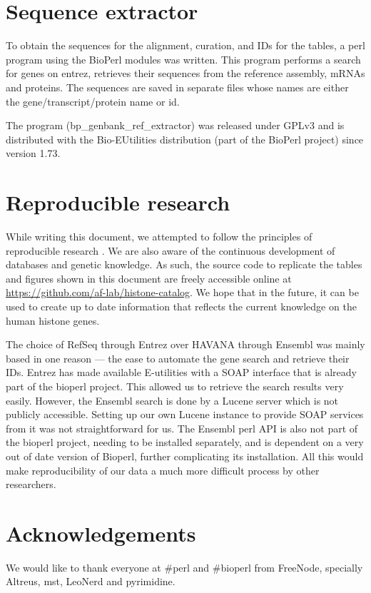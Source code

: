 \documentclass[10pt,a4paper,twocolumn,article]{memoir}
\begin{document}
  \section{Sequence extractor}
    To obtain the sequences for the alignment, curation, and IDs for the tables, a perl program using the
    BioPerl modules was written. This program performs a search for genes on entrez, retrieves
    their sequences from the reference assembly, mRNAs and proteins. The sequences are saved in separate files whose
    names are either the gene/transcript/protein name or id.

    The program (bp\_genbank\_ref\_extractor) was released under GPLv3 and is distributed with
    the Bio-EUtilities distribution (part of the BioPerl project) since version 1.73.


  \section{Reproducible research}
  \label{sec:reproducible}
    While writing this document, we attempted to follow the principles of reproducible research
    \citep{reproducible-research-bioinformatics, reproducible-research-law}.
    We are also aware of the continuous development of databases and genetic knowledge. As such,
    the source code to replicate the tables and figures shown in this document are freely accessible
    online at \url{https://github.com/af-lab/histone-catalog}. We hope that in the future, it can
    be used to create up to date information
    that reflects the current knowledge on the human histone genes.

    The choice of RefSeq through Entrez over HAVANA through Ensembl was mainly based in one reason --- the ease
    to automate the gene search and retrieve their IDs. Entrez has made available E-utilities with a SOAP interface
    that is already part of the bioperl project. This allowed us to retrieve the search results very easily.
    However, the Ensembl search is done by a Lucene server which is not publicly accessible. Setting up our own
    Lucene instance to provide SOAP services from it was not straightforward for us. The Ensembl perl API is
    also not part of the bioperl project, needing to be installed separately, and is dependent on a very
    out of date version of Bioperl, further complicating its installation. All this would make reproducibility
    of our data a much more difficult process by other researchers.

  \section{Acknowledgements}
    We would like to thank everyone at \#perl and \#bioperl from FreeNode, specially Altreus, mst, LeoNerd and pyrimidine.

  
  
\end{document}
